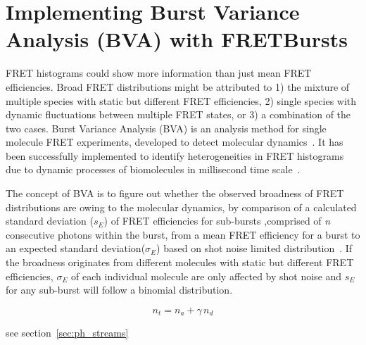 \section{Implementing Burst Variance Analysis (BVA) with FRETBursts}

FRET histograms could show more information than just mean FRET efficiencies. Broad FRET distributions might be attributed to 1) the mixture of multiple species with static but different FRET efficiencies, 2) single species with dynamic fluctuations between multiple FRET states, or 3) a combination of the two cases. Burst Variance Analysis (BVA) is an analysis method for single molecule FRET experiments, developed to detect molecular dynamics~\cite{Torella_2011}. It has been successfully implemented to identify heterogeneities in FRET histograms due to dynamic processes of biomolecules in millisecond time scale~\cite{Torella_2011, Robb_2013}.

The concept of BVA is to figure out whether the observed broadness of FRET distributions are owing to the molecular dynamics, by comparison of a calculated standard deviation ($s_E$) of FRET efficiencies for sub-bursts ,comprised of \textit{n} consecutive photons within the burst, from a mean FRET efficiency for a burst to an expected standard deviation($\sigma_E$) based on shot noise limited distribution~\cite{Torella_2011}. If the broadness originates from different molecules with static but different FRET efficiencies, $\sigma_E$ of each individual molecule are only affected by shot noise and $s_E$ for any sub-burst will follow a binomial distribution.  

$$ n_t = n_a + \gamma\,n_d$$ 

see section~\ref{sec:ph_streams}
